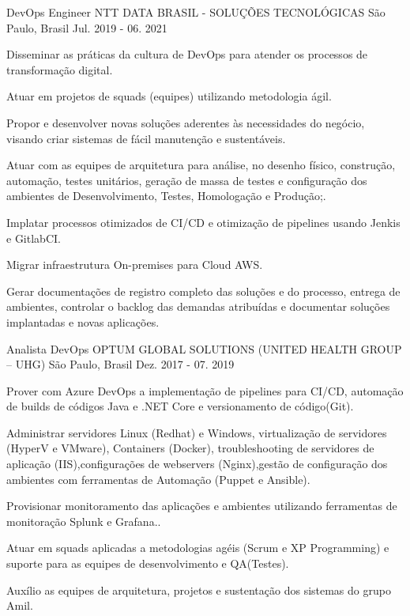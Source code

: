 \begin{cventries}
  \cventry
    {DevOps Engineer} %
    {NTT DATA BRASIL - SOLUÇÕES TECNOLÓGICAS} %
    {São Paulo, Brasil} %
    {Jul. 2019 - 06. 2021} %
    {
      \begin{cvitems} %
        \item {Disseminar as práticas da cultura de DevOps para atender os processos de transformação digital.}
        \item {Atuar em projetos de squads (equipes) utilizando metodologia ágil.}
        \item {Propor e desenvolver novas soluções aderentes às necessidades do negócio, visando criar sistemas de fácil manutenção e sustentáveis.}
        \item {Atuar com as equipes de arquitetura para análise, no desenho físico, construção, automação, testes unitários, geração de massa de testes e configuração dos ambientes de Desenvolvimento, Testes, Homologação e Produção;.}
        \item {Implatar processos otimizados de CI/CD e otimização de pipelines usando Jenkis e GitlabCI.}
        \item {Migrar infraestrutura On-premises para Cloud AWS.}
        \item {Gerar documentações de registro completo das soluções e do processo, entrega de ambientes, controlar o backlog das demandas atribuídas e documentar soluções implantadas e novas aplicações.}
      \end{cvitems}
    }

  \cventry
    {Analista DevOps} %
    {OPTUM GLOBAL SOLUTIONS (UNITED HEALTH GROUP – UHG)} %
    {São Paulo, Brasil} %
    {Dez. 2017 - 07. 2019} %
    {
      \begin{cvitems} %
        \item {Prover com  Azure DevOps a implementação de pipelines para CI/CD, automação de builds de códigos Java e .NET Core e versionamento de código(Git).}
        \item {Administrar servidores Linux (Redhat) e Windows, virtualização de servidores (HyperV e VMware), Containers (Docker), troubleshooting de servidores de aplicação (IIS),configurações de webservers (Nginx),gestão de configuração dos ambientes com ferramentas de Automação (Puppet e Ansible).}
        \item {Provisionar monitoramento das aplicações e ambientes utilizando ferramentas de monitoração Splunk e Grafana..}
        \item {Atuar em squads aplicadas a metodologias agéis (Scrum e XP Programming) e suporte para as equipes de desenvolvimento e QA(Testes).}
        \item {Auxílio as equipes de arquitetura, projetos e sustentação dos sistemas do grupo Amil.}
      \end{cvitems}
    }


\end{cventries}
